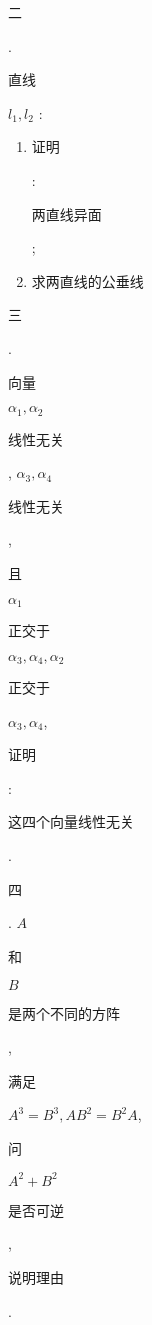 \documentclass[10pt]{article}
\begin{document}
\begin{CJK}{UTF8}{mj}二\end{CJK}. \begin{CJK}{UTF8}{mj}直线\end{CJK} $l_{1}, l_{2}$ :

\begin{enumerate}
  \item \begin{CJK}{UTF8}{mj}证明\end{CJK}: \begin{CJK}{UTF8}{mj}两直线异面\end{CJK};

  \item \begin{CJK}{UTF8}{mj}求两直线的公垂线\end{CJK}

\end{enumerate}
\begin{CJK}{UTF8}{mj}三\end{CJK}. \begin{CJK}{UTF8}{mj}向量\end{CJK} $\alpha_{1}, \alpha_{2}$ \begin{CJK}{UTF8}{mj}线性无关\end{CJK}, $\alpha_{3}, \alpha_{4}$ \begin{CJK}{UTF8}{mj}线性无关\end{CJK}, \begin{CJK}{UTF8}{mj}且\end{CJK} $\alpha_{1}$ \begin{CJK}{UTF8}{mj}正交于\end{CJK} $\alpha_{3}, \alpha_{4}, \alpha_{2}$ \begin{CJK}{UTF8}{mj}正交于\end{CJK} $\alpha_{3}, \alpha_{4}$, \begin{CJK}{UTF8}{mj}证明\end{CJK}: \begin{CJK}{UTF8}{mj}这四个向量线性无关\end{CJK}.

\begin{CJK}{UTF8}{mj}四\end{CJK}. $A$ \begin{CJK}{UTF8}{mj}和\end{CJK} $B$ \begin{CJK}{UTF8}{mj}是两个不同的方阵\end{CJK}, \begin{CJK}{UTF8}{mj}满足\end{CJK} $A^{3}=B^{3}, A B^{2}=B^{2} A$, \begin{CJK}{UTF8}{mj}问\end{CJK} $A^{2}+B^{2}$ \begin{CJK}{UTF8}{mj}是否可逆\end{CJK}, \begin{CJK}{UTF8}{mj}说明理由\end{CJK}.
\end{document}
